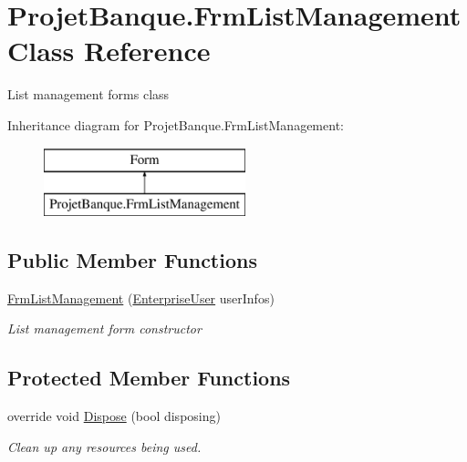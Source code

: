 \hypertarget{class_projet_banque_1_1_frm_list_management}{}\section{Projet\+Banque.\+Frm\+List\+Management Class Reference}
\label{class_projet_banque_1_1_frm_list_management}


List management form\textquotesingle{}s class  


Inheritance diagram for Projet\+Banque.\+Frm\+List\+Management\+:\begin{figure}[H]
\begin{center}
\leavevmode
\includegraphics[height=2.000000cm]{class_projet_banque_1_1_frm_list_management}
\end{center}
\end{figure}
\subsection*{Public Member Functions}
\begin{DoxyCompactItemize}
\item 
\mbox{\hyperlink{class_projet_banque_1_1_frm_list_management_aefda22a1f107406811a2ed39f44342da}{Frm\+List\+Management}} (\mbox{\hyperlink{class_projet_banque_1_1_enterprise_user}{Enterprise\+User}} user\+Infos)
\begin{DoxyCompactList}\small\item\em List management form constructor \end{DoxyCompactList}\end{DoxyCompactItemize}
\subsection*{Protected Member Functions}
\begin{DoxyCompactItemize}
\item 
override void \mbox{\hyperlink{class_projet_banque_1_1_frm_list_management_a9f20a69bc9b201bd02203ad8a3a03bff}{Dispose}} (bool disposing)
\begin{DoxyCompactList}\small\item\em Clean up any resources being used. \end{DoxyCompactList}\end{DoxyCompactItemize}


